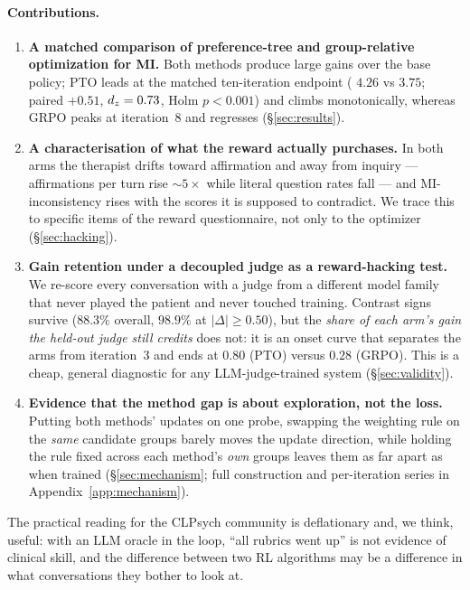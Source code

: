 \paragraph{Contributions.}
\begin{enumerate}\itemsep2pt
  \item \textbf{A matched comparison of preference-tree and group-relative optimization
  for MI.} Both methods produce large gains over the base policy; PTO leads at the matched
  ten-iteration endpoint (\QQ{} $4.26$ vs $3.75$; paired $+0.51$, $d_z{}=0.73$,
  Holm $p<0.001$) and climbs monotonically, whereas GRPO peaks at iteration~8 and regresses
  (\S\ref{sec:results}).

  \item \textbf{A characterisation of what the reward actually purchases.} In both arms the
  therapist drifts toward affirmation and away from inquiry --- affirmations per turn rise
  ${\sim}5\times$ while literal question rates fall --- and MI-inconsistency rises with the
  scores it is supposed to contradict. We trace this to specific items of the reward
  questionnaire, not only to the optimizer (\S\ref{sec:hacking}).

  \item \textbf{Gain retention under a decoupled judge as a reward-hacking test.} We
  re-score every conversation with a judge from a different model family that never played
  the patient and never touched training. Contrast signs survive ($88.3\%$ overall,
  $98.9\%$ at $|\Delta|\!\ge\!0.50$), but the \emph{share of each arm's gain the held-out
  judge still credits} does not: it is an onset curve that separates the arms from
  iteration~3 and ends at $0.80$ (PTO) versus $0.28$ (GRPO). This is a cheap, general
  diagnostic for any LLM-judge-trained system (\S\ref{sec:validity}).

  \item \textbf{Evidence that the method gap is about exploration, not the loss.} Putting
  both methods' updates on one probe, swapping the weighting rule on the \emph{same}
  candidate groups barely moves the update direction, while holding the rule fixed across
  each method's \emph{own} groups leaves them as far apart as when trained
  (\S\ref{sec:mechanism}; full construction and per-iteration series in
  Appendix~\ref{app:mechanism}).
\end{enumerate}

The practical reading for the CLPsych community is deflationary and, we think, useful: with
an LLM oracle in the loop, ``all rubrics went up'' is not evidence of clinical skill, and
the difference between two RL algorithms may be a difference in what conversations they
bother to look at.
